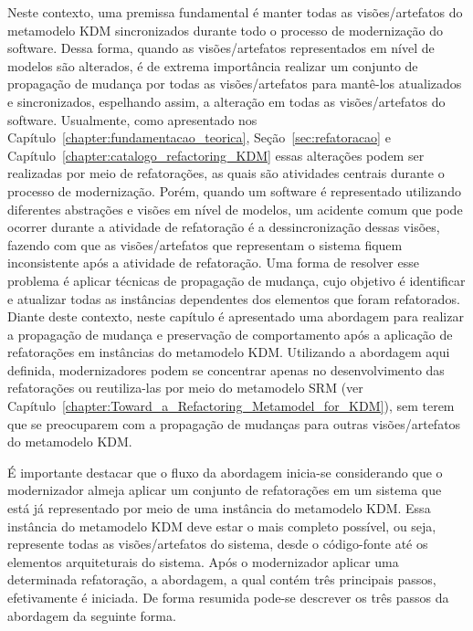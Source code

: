 Neste contexto, uma premissa fundamental é manter todas as visões/artefatos do metamodelo KDM sincronizados durante todo o processo de modernização do software. Dessa forma, quando as visões/artefatos representados em nível de modelos são alterados, é de extrema importância realizar um conjunto de propagação de mudança por todas as visões/artefatos para mantê-los atualizados e sincronizados, espelhando assim, a alteração em todas as visões/artefatos do software. Usualmente, como apresentado nos Capítulo~\ref{chapter:fundamentacao_teorica}, Seção~\ref{sec:refatoracao} e Capítulo~\ref{chapter:catalogo_refactoring_KDM} essas alterações podem ser realizadas por meio de refatorações, as quais são atividades centrais durante o processo de modernização. Porém, quando um software é representado utilizando diferentes abstrações e visões em nível de modelos, um acidente comum que pode ocorrer durante a atividade de refatoração é a dessincronização dessas visões, fazendo com que as visões/artefatos que representam o sistema fiquem inconsistente após a atividade de refatoração. Uma forma de resolver esse problema é aplicar técnicas de propagação de mudança, cujo objetivo é identificar e atualizar todas as instâncias dependentes dos elementos que foram refatorados.%
Diante deste contexto, neste capítulo é apresentado uma abordagem para realizar a propagação de mudança e preservação de comportamento após a aplicação de refatorações em instâncias do metamodelo KDM. Utilizando a abordagem aqui definida, modernizadores podem se concentrar apenas no desenvolvimento das refatorações ou reutiliza-las por meio do metamodelo SRM (ver Capítulo~\ref{chapter:Toward_a_Refactoring_Metamodel_for_KDM}), sem terem que se preocuparem com a propagação de mudanças para outras visões/artefatos do metamodelo KDM. 

É importante destacar que o fluxo da abordagem inicia-se considerando que o modernizador almeja aplicar um conjunto de refatorações em um sistema que está já representado por meio de uma instância do metamodelo KDM. Essa instância do metamodelo KDM deve estar o mais completo possível, ou seja, represente todas as visões/artefatos do sistema, desde o código-fonte até os elementos arquiteturais do sistema. Após o modernizador aplicar uma determinada refatoração, a abordagem, a qual contém três principais passos, efetivamente é iniciada. De forma resumida pode-se descrever os três passos da abordagem da seguinte forma. 

